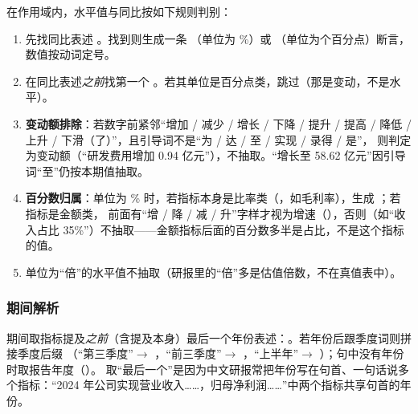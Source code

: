 在作用域内，水平值与同比按如下规则判别：
\begin{enumerate}
\item 先找同比表述 。找到则生成一条 （单位为 \%）或 （单位为个百分点）断言，数值按动词定号。
\item 在同比表述\emph{之前}找第一个 。若其单位是百分点类，跳过（那是变动，不是水平）。
\item \textbf{变动额排除}：若数字前紧邻“增加 / 减少 / 增长 / 下降 / 提升 / 提高 / 降低 / 上升 / 下滑（了）”，且引导词不是“为 / 达 / 至 / 实现 / 录得 / 是”，
  则判定为变动额（“研发费用增加 0.94 亿元”），不抽取。“增长至 58.62 亿元”因引导词“至”仍按本期值抽取。
\item \textbf{百分数归属}：单位为 \% 时，若指标本身是比率类（，如毛利率），生成 ；若指标是金额类，
  前面有“增 / 降 / 减 / 升”字样才视为增速（），否则（如“收入占比 35\%”）不抽取——金额指标后面的百分数多半是占比，不是这个指标的值。
\item 单位为“倍”的水平值不抽取（研报里的“倍”多是估值倍数，不在真值表中）。
\end{enumerate}

\subsubsection{期间解析}

期间取指标提及\emph{之前}（含提及本身）最后一个年份表述：。若年份后跟季度词则拼接季度后缀
（“第三季度”$\to$ ，“前三季度”$\to$ ，“上半年”$\to$ ）；句中没有年份时取报告年度（）。
取“最后一个”是因为中文研报常把年份写在句首、一句话说多个指标：“2024 年公司实现营业收入……，归母净利润……”中两个指标共享句首的年份。


